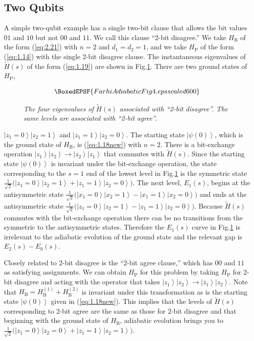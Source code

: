 \documentclass[twoside]{article}
\newcommand{\ket}[1]{\left|#1\right\rangle}
\newcommand{\refEq}[1]{(\ref{eq:#1})}
\newcommand{\numFig}[3]{\begin{figure}[ht]
 $$\BoxedEPSF{#3}$$
    \caption{#2}\label{fig:#1}
   \end{figure}}
\newcommand{\refFig}[1]{Fig.\thinspace\ref{fig:#1}}
\newcommand{\rP}{{\mathrm{P}}}
\newcommand{\rB}{{\mathrm{B}}}
\let\tilde\widetilde
\let\bar\overline
\numberwithin{equation}{section}
\begin{document}
\subsection{Two Qubits} A simple two-qubit example has a single two-bit
clause that allows the bit values $01$ and
$10$ but not $00$ and $11$. We call this clause ``2-bit  disagree.'' We take
$H_\rB$ of the form \refEq{2.21} with $n=2$ and $d_1=d_2=1$,  and we
take $H_\rP$ of the form
\refEq{1.14} with the single 2-bit disagree clause.  The instantaneous
eigenvalues of $\tilde H(s)$ of the form \refEq{1.19} are shown in
\refFig{4}. There are two ground states of $H_\rP$,
\numFig{4}{\slshape  The four eigenvalues of $\tilde H(s)$ associated with
``2-bit disagree''.  The same levels are associated with ``2-bit
agree''.}{FarhiAdiabaticFig4.eps scaled 600}
$\ket{z_1=0}\ket{z_2=1}$ and $\ket{z_1=1}\ket{z_2=0}$. The starting state
$\ket{\psi(0)}$, which is the ground state of $H_\rB$, is \refEq{1.18new}
with
$n=2$. There is a bit-exchange operation $\ket{z_1}\ket{z_2} \to \ket{z_2}
\ket{z_1}$ that commutes with $\tilde H(s)$. Since the starting state
$\ket{\psi(0)}$ is invariant under the bit-exchange operation, the state
corresponding to the $s=1$ end of the lowest level in \refFig{4} is the
symmetric state $\frac1{\sqrt2} \bigl(
\ket{z_1=0}\ket{z_2=1} + \ket{z_1=1}\ket{z_2=0}\bigr)$. The next level,
$E_1(s)$, begins at the antisymmetric state 
$\frac1{\sqrt2} \bigl(
\ket{x_1=0}\ket{x_2=1} - \ket{x_1=1}\ket{x_2=0}\bigr)$ and ends at the
antisymmetric state 
$\frac1{\sqrt2} \bigl(
\ket{z_1=0}\ket{z_2=1} - \ket{z_1=1}\ket{z_2=0}\bigr)$. Because $\tilde
H(s)$ commutes with the bit-exchange operation there can be no
transitions from the symmetric to the antisymmetric states. Therefore the
$E_1(s)$ curve in \refFig{4} is irrelevant to the adiabatic evolution of the
ground state and the relevant gap is $E_2(s) - E_0(s)$. 

Closely related to  2-bit disagree is the ``2-bit agree clause,'' which has
$00$ and $11$ as satisfying assignments.  We can obtain $H_\rP$ for this
problem by taking $H_\rP$ for 2-bit disagree and acting with the operator
that takes
$\ket{z_1}\ket{z_2}\to \ket{\bar z_1}\ket{z_2}$. Note that
$H_\rB=H_\rB^{(1)} + H_\rB^{(2)}$ is invariant under this transformation as
is the starting state
$\ket{\psi(0)}$ given in
\refEq{1.18new}. This implies that the levels of $\tilde H(s)$ corresponding
to 2-bit agree are the same as those for 2-bit disagree and that beginning
with the ground state of $H_\rB$, adiabatic evolution brings you to 
$\frac1{\sqrt2} \bigl(
\ket{z_1=0}\ket{z_2=0} + \ket{z_1=1}\ket{z_2=1}\bigr)$.
\end{document}
